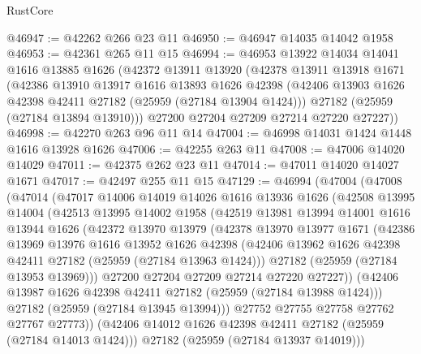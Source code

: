 \begin{lexlean}{RustCore}
\begin{coremodule}
@46947 := @42262 @266 @23 @11
@46950 := @46947 @14035 @14042 @1958
@46953 := @42361 @265 @11 @15
@46994 := @46953
    @13922
    @14034
    @14041
    @1616
    @13885
    @1626
    (@42372
      @13911
      @13920
      (@42378
        @13911
        @13918
        @1671
        (@42386
          @13910
          @13917
          @1616
          @13893
          @1626
          @42398
          (@42406 @13903 @1626 @42398 @42411 @27182 (@25959 (@27184 @13904 @1424)))
          @27182
          (@25959 (@27184 @13894 @13910)))
        @27200
        @27204
        @27209
        @27214
        @27220
        @27227))
@46998 := @42270 @263 @96 @11 @14
@47004 := @46998 @14031 @1424 @1448 @1616 @13928 @1626
@47006 := @42255 @263 @11
@47008 := @47006 @14020 @14029
@47011 := @42375 @262 @23 @11
@47014 := @47011 @14020 @14027 @1671
@47017 := @42497 @255 @11 @15
@47129 := @46994
    (@47004
      (@47008
        (@47014
          (@47017
            @14006
            @14019
            @14026
            @1616
            @13936
            @1626
            (@42508
              @13995
              @14004
              (@42513
                @13995
                @14002
                @1958
                (@42519
                  @13981
                  @13994
                  @14001
                  @1616
                  @13944
                  @1626
                  (@42372
                    @13970
                    @13979
                    (@42378
                      @13970
                      @13977
                      @1671
                      (@42386
                        @13969
                        @13976
                        @1616
                        @13952
                        @1626
                        @42398
                        (@42406 @13962 @1626 @42398 @42411 @27182 (@25959 (@27184 @13963 @1424)))
                        @27182
                        (@25959 (@27184 @13953 @13969)))
                      @27200
                      @27204
                      @27209
                      @27214
                      @27220
                      @27227))
                  (@42406 @13987 @1626 @42398 @42411 @27182 (@25959 (@27184 @13988 @1424)))
                  @27182
                  (@25959 (@27184 @13945 @13994)))
                @27752
                @27755
                @27758
                @27762
                @27767
                @27773))
            (@42406 @14012 @1626 @42398 @42411 @27182 (@25959 (@27184 @14013 @1424)))
            @27182
            (@25959 (@27184 @13937 @14019)))

\end{coremodule}
\end{lexlean}
